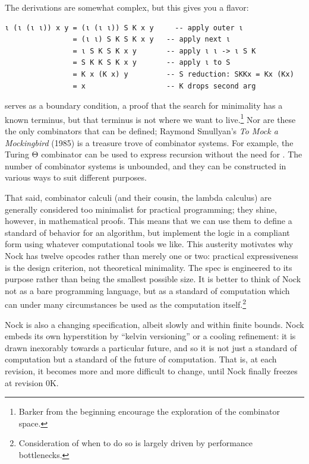 \noindent
The derivations are somewhat complex, but this gives you a flavor:

\begin{lstlisting}[style=listingcomb]
ι (ι (ι ι)) x y = (ι (ι ι)) S K x y     -- apply outer ι
                = (ι ι) S K S K x y   -- apply next ι
                = ι S K S K x y       -- apply ι ι -> ι S K
                = S K K S K x y       -- apply ι to S
                = K x (K x) y         -- S reduction: SKKx = Kx (Kx)
                = x                   -- K drops second arg
\end{lstlisting}

 serves as a boundary condition, a proof that the search for minimality has a known terminus, but that terminus is not where we want to live.\footnote{Barker from the beginning encourage the exploration of the  combinator space.}
Nor are these the only combinators that can be defined; Raymond Smullyan's \emph{To Mock a Mockingbird} (1985) is a treasure trove of combinator systems.  For example, the Turing \textsc{Θ} combinator can be used to express recursion without the need for .  The number of combinator systems is unbounded, and they can be constructed in various ways to suit different purposes.

That said, combinator calculi (and their cousin, the lambda calculus) are generally considered too minimalist for practical programming; they shine, however, in mathematical proofs.  This means that we can use them to define a standard of behavior for an algorithm, but implement the logic in a compliant form using whatever computational tools we like.  This austerity motivates why Nock has twelve opcodes rather than merely one or two:  practical expressiveness is the design criterion, not theoretical minimality.  The spec is engineered to its purpose rather than being the smallest possible size.  It is better to think of Nock not as a bare programming language, but as a standard of computation which can under many circumstances be used as the computation itself.\footnote{Consideration of when to do so is largely driven by performance bottlenecks.}

Nock is also a changing specification, albeit slowly and within finite bounds.  Nock embeds its own hyperstition by ``kelvin versioning'' or a cooling refinement:  it is drawn inexorably towards a particular future, and so it is not just a standard of computation but a standard of the future of computation.  That is, at each revision, it becomes more and more difficult to change, until Nock finally freezes at revision 0K.

